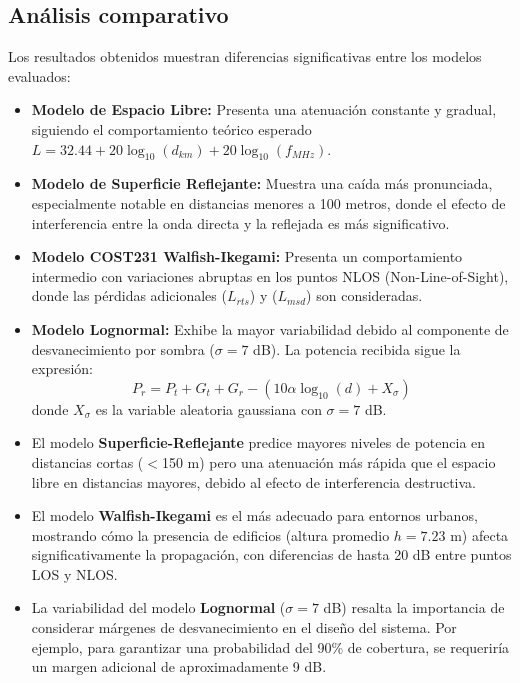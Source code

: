 \begin{enumerate}
\subsection{Análisis comparativo}

Los resultados obtenidos muestran diferencias significativas entre los modelos evaluados:

\begin{itemize}
    \item \textbf{Modelo de Espacio Libre:} Presenta una atenuación constante y gradual, siguiendo el comportamiento teórico esperado $L = 32.44 + 20\log_{10}(d_{km}) + 20\log_{10}(f_{MHz})$.
    
    \item \textbf{Modelo de Superficie Reflejante:} Muestra una caída más pronunciada, especialmente notable en distancias menores a 100 metros, donde el efecto de interferencia entre la onda directa y la reflejada es más significativo.
    
    \item \textbf{Modelo COST231 Walfish-Ikegami:} Presenta un comportamiento intermedio con variaciones abruptas en los puntos NLOS (Non-Line-of-Sight), donde las pérdidas adicionales ($L_{rts}$) y ($L_{msd}$) son consideradas. 
    
    \item \textbf{Modelo Lognormal:} Exhibe la mayor variabilidad debido al componente de desvanecimiento por sombra ($\sigma=7$ dB). La potencia recibida sigue la expresión:
    \begin{equation}
        P_r = P_t + G_t + G_r - (10\alpha\log_{10}(d) + X_\sigma)
    \end{equation}
    donde $X_\sigma$ es la variable aleatoria gaussiana con $\sigma=7$ dB.
\end{itemize}

\begin{itemize}
    \item El modelo \textbf{Superficie-Reflejante} predice mayores niveles de potencia en distancias cortas ($<$150 m) pero una atenuación más rápida que el espacio libre en distancias mayores, debido al efecto de interferencia destructiva.
    
    \item El modelo \textbf{Walfish-Ikegami} es el más adecuado para entornos urbanos, mostrando cómo la presencia de edificios (altura promedio $h=7.23$ m) afecta significativamente la propagación, con diferencias de hasta 20 dB entre puntos LOS y NLOS.
    
    \item La variabilidad del modelo \textbf{Lognormal} ($\sigma=7$ dB) resalta la importancia de considerar márgenes de desvanecimiento en el diseño del sistema. Por ejemplo, para garantizar una probabilidad del 90\% de cobertura, se requeriría un margen adicional de aproximadamente 9 dB.
    
\end{itemize}

\end{enumerate}
